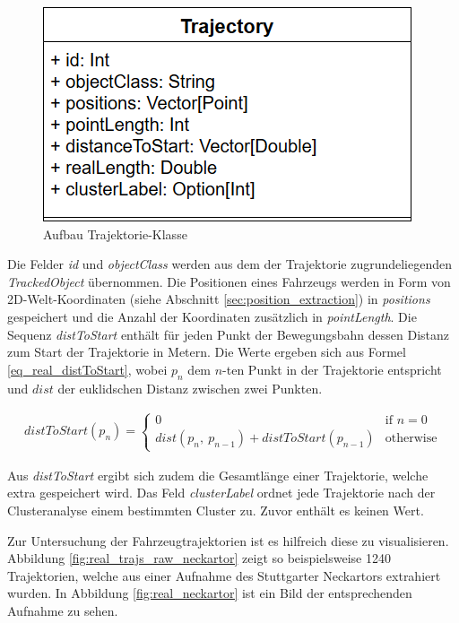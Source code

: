 \begin{figure}[H]
\centering
    \includegraphics[width=0.38\linewidth]{resources/img/umsetzung/U1/Trajectory_ClassDia}
\caption{Aufbau Trajektorie-Klasse}
\label{fig:real_trajectory_classDia}
\end{figure}

Die Felder \textit{id} und \textit{objectClass} werden aus dem der Trajektorie zugrundeliegenden \textit{TrackedObject}
übernommen.
Die Positionen eines Fahrzeugs werden in Form von 2D-Welt-Koordinaten (siehe Abschnitt \ref{sec:position_extraction})
in \textit{positions} gespeichert und die Anzahl der Koordinaten zusätzlich in \textit{pointLength}.
Die Sequenz \textit{distToStart} enthält für jeden Punkt der Bewegungsbahn dessen Distanz zum Start der Trajektorie in Metern.
Die Werte ergeben sich aus Formel \ref{eq_real_distToStart}, wobei $p_n$ dem $n$-ten Punkt in der Trajektorie entspricht
und $dist$ der euklidschen Distanz zwischen zwei Punkten.

\begin{ceqn}
\begin{align}
\label{eq_real_distToStart}
    distToStart(p_n) =
    \begin{cases}
        0 & \text{if } n = 0 \\
        dist(p_n,\ p_{n-1}) + distToStart(p_{n-1}) & \text{otherwise}
    \end{cases}
\end{align}
\end{ceqn}

Aus \textit{distToStart} ergibt sich zudem die Gesamtlänge einer Trajektorie, welche extra gespeichert wird.
Das Feld \textit{clusterLabel} ordnet jede Trajektorie nach der Clusteranalyse einem bestimmten Cluster zu.
Zuvor enthält es keinen Wert.

Zur Untersuchung der Fahrzeugtrajektorien ist es hilfreich diese zu visualisieren. Abbildung \ref{fig:real_trajs_raw_neckartor}
zeigt so beispielsweise 1240 Trajektorien, welche aus einer Aufnahme des Stuttgarter Neckartors extrahiert wurden.
In Abbildung \ref{fig:real_neckartor} ist ein Bild der entsprechenden Aufnahme zu sehen.

